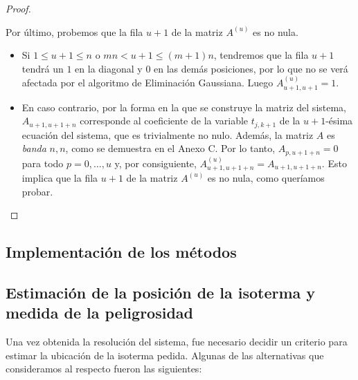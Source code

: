 \begin{proof}
\begin{itemize}
          Por último, probemos que la fila $u + 1$ de la matriz $A^{(u)}$ es no nula.
          \begin{itemize}
            \item Si $1 \leq u + 1 \leq n$ o $mn < u + 1 \leq (m+1)n$, tendremos que la fila $u + 1$ tendrá un $1$ en la diagonal y $0$ en las demás posiciones, por lo que no se verá afectada por el algoritmo de Eliminación Gaussiana. Luego $A^{(u)}_{u+1,u+1} = 1$.
            \item En caso contrario, por la forma en la que se construye la matriz del sistema, $A_{u+1,u+1+n}$ corresponde al coeficiente de la variable $t_{j,k+1}$ de la $u + 1$-ésima ecuación del sistema, que es trivialmente no nulo. Además, la matriz $A$ es \emph{banda} $n, n$, como se demuestra en el Anexo C. Por lo tanto, $A_{p,u+1+n} = 0$ para todo $p = 0, \dots, u$ y, por consiguiente, $A^{(u)}_{u+1,u+1+n} = A_{u+1,u+1+n}$. Esto implica que la fila $u + 1$ de la matriz $A^{(u)}$ es no nula, como queríamos probar. \qedhere
          \end{itemize}
        \end{itemize}
      \end{proof}

  \subsection{Implementación de los métodos}

  \subsection{Estimación de la posición de la isoterma y medida de la peligrosidad}

    Una vez obtenida la resolución del sistema, fue necesario decidir un criterio para estimar la ubicación de la isoterma pedida. Algunas de las alternativas que consideramos al respecto fueron las siguientes:

